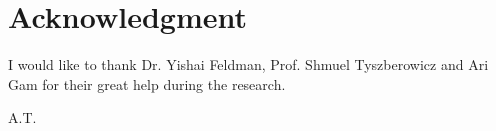 \section*{Acknowledgment}
I would like to thank Dr. Yishai Feldman, Prof. Shmuel Tyszberowicz and Ari Gam for their great help during the research. 

\begin{flushright}
A.T.\\[1pc]
\end{flushright}